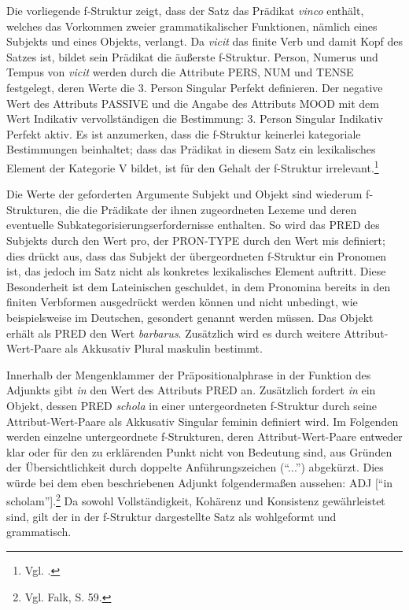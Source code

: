 \documentclass[12pt,a4paper]{article}
\begin{document}
Die vorliegende f-Struktur zeigt, dass der Satz das Prädikat \textit{vinco} enthält, welches das Vorkommen zweier grammatikalischer Funktionen, nämlich eines Subjekts und eines Objekts, verlangt. Da \textit{vicit} das finite Verb und damit Kopf des Satzes ist, bildet sein Prädikat die äußerste f-Struktur. Person, Numerus und Tempus von \textit{vicit} werden durch die Attribute  PERS, NUM und TENSE festgelegt, deren Werte die 3. Person Singular Perfekt definieren. Der negative Wert des Attributs PASSIVE und die Angabe des Attributs MOOD mit dem Wert Indikativ vervollständigen die Bestimmung: 3. Person Singular Indikativ Perfekt aktiv. Es ist anzumerken, dass die f-Struktur keinerlei kategoriale Bestimmungen beinhaltet; dass das Prädikat in diesem Satz ein lexikalisches Element der Kategorie V bildet, ist für den Gehalt der f-Struktur irrelevant.\footnote{Vgl. \cite[7]{Skript}.}

Die Werte der geforderten Argumente Subjekt und Objekt sind wiederum f-Strukturen, die die Prädikate der ihnen zugeordneten Lexeme und deren eventuelle Subkategorisierungserfordernisse enthalten. So wird das PRED des Subjekts durch den Wert pro, der PRON-TYPE durch den Wert mis definiert; dies drückt aus, dass das Subjekt der übergeordneten f-Struktur ein Pronomen ist, das jedoch im Satz nicht als konkretes lexikalisches Element auftritt. Diese Besonderheit ist dem Lateinischen geschuldet, in dem Pronomina bereits in den finiten Verbformen ausgedrückt werden können und nicht unbedingt, wie beispielsweise im Deutschen, gesondert genannt werden müssen. Das Objekt erhält als PRED den Wert \textit{barbarus}. Zusätzlich wird es durch weitere Attribut-Wert-Paare als Akkusativ Plural maskulin bestimmt.

Innerhalb der Mengenklammer der Präpositionalphrase in der Funktion des Adjunkts gibt \textit{in} den Wert des Attributs PRED an. Zusätzlich fordert \textit{in} ein Objekt, dessen PRED \textit{schola} in einer untergeordneten f-Struktur durch seine Attribut-Wert-Paare als Akkusativ Singular feminin definiert wird. Im Folgenden werden einzelne untergeordnete f-Strukturen, deren Attribut-Wert-Paare entweder klar oder für den zu erklärenden Punkt nicht von Bedeutung sind, aus Gründen der Übersichtlichkeit durch doppelte Anführungszeichen (``...'') abgekürzt. Dies würde bei dem eben beschriebenen Adjunkt folgendermaßen aussehen: ADJ [“in scholam''].\footnote{Vgl. Falk, S. 59.}
Da sowohl Vollständigkeit, Kohärenz und Konsistenz gewährleistet sind, gilt der in der f-Struktur dargestellte Satz als wohlgeformt und grammatisch.
\end{document}
